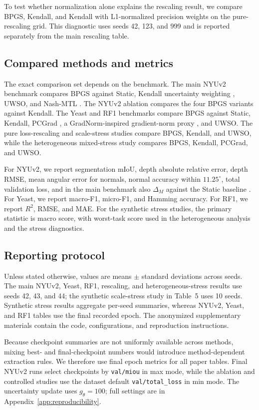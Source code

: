 To test whether normalization alone explains the rescaling result, we compare BPGS, Kendall, and
Kendall with L1-normalized precision weights on the pure-rescaling grid. This diagnostic uses seeds
42, 123, and 999 and is reported separately from the main rescaling table.

\subsection{Compared methods and metrics}
The exact comparison set depends on the benchmark. The main NYUv2 benchmark compares BPGS against Static, Kendall uncertainty weighting \cite{kendall2018}, UWSO, and Nash-MTL \cite{navon2022nash}. The NYUv2 ablation compares the four BPGS variants against Kendall. The Yeast and RF1 benchmarks compare BPGS against Static, Kendall, PCGrad \cite{yu2020pcgrad}, a GradNorm-inspired gradient-norm proxy \cite{chen2018gradnorm}, and UWSO. The pure loss-rescaling and scale-stress studies compare BPGS, Kendall, and UWSO, while the heterogeneous mixed-stress study compares BPGS, Kendall, PCGrad, and UWSO.

For NYUv2, we report segmentation mIoU, depth absolute relative error, depth RMSE, mean angular error for normals, normal accuracy within $11.25^\circ$, total validation loss, and in the main benchmark also $\Delta_M$ against the Static baseline \cite{liu2019mtan}. For Yeast, we report macro-F1, micro-F1, and Hamming accuracy. For RF1, we report $R^2$, RMSE, and MAE. For the synthetic stress studies, the primary statistic is macro score, with worst-task score used in the heterogeneous analysis and the stress diagnostics.

\subsection{Reporting protocol}
Unless stated otherwise, values are means $\pm$ standard deviations across seeds. The main NYUv2,
Yeast, RF1, rescaling, and heterogeneous-stress results use seeds 42, 43, and 44; the synthetic
scale-stress study in Table~5 uses 10 seeds. Synthetic stress results aggregate per-seed summaries,
whereas NYUv2, Yeast, and RF1 tables use the final recorded epoch. The anonymized supplementary
materials contain the code, configurations, and reproduction instructions.

Because checkpoint summaries are not uniformly available across methods, mixing best- and
final-checkpoint numbers would introduce method-dependent extraction rules. We therefore use final
epoch metrics for all paper tables. Final NYUv2 runs select checkpoints by \texttt{val/miou} in max
mode, while the ablation and controlled studies use the dataset default
\texttt{val/total\_loss} in min mode. The uncertainty update uses $g_\theta=100$; full settings are
in Appendix~\ref{app:reproducibility}.
